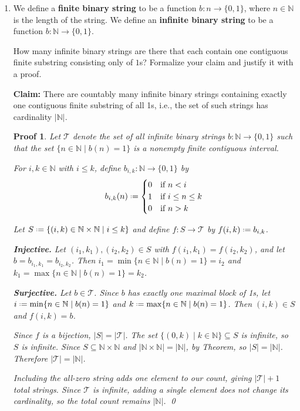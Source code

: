 \documentclass[12pt]{article}
\newcommand{\defn}[1]{\textbf{#1}}
\newcommand{\defeq}{\mathrel{\vcenter{\baselineskip0.5ex \lineskiplimit0pt
                     \hbox{\scriptsize.}\hbox{\scriptsize.}}}=}
\theoremstyle{proofstyle}
\newtheorem*{proof*}{Proof}
\begin{document}
\begin{enumerate}[left=0pt, itemsep=2em, parsep=1em]
\item We define a \defn{finite binary string} to be a function $b : n \to \{0, 1\}$, where $n \in \mathbb{N}$
is the length of the string. We define an \defn{infinite binary string} to be a function
$b : \mathbb{N} \to \{0, 1\}$.

How many infinite binary strings are there that each contain one contiguous finite
substring consisting only of $1$s? Formalize your claim and justify it with a proof.

\textbf{Claim:} There are countably many infinite binary strings containing exactly one
contiguous finite substring of all 1s, i.e., the set of such strings has cardinality $|\mathbb{N}|$.

\begin{proof*}
Let $\mathcal{T}$ denote the set of all infinite binary strings $b : \mathbb{N} \to \{0,1\}$
such that the set $\{n \in \mathbb{N} \mid b(n) = 1\}$ is a nonempty finite contiguous
interval.

For $i, k \in \mathbb{N}$ with $i \leq k$, define $b_{i,k} : \mathbb{N} \to \{0,1\}$ by
\[
  b_{i,k}(n) \defeq \begin{cases} 0 & \text{if } n < i \\ 1 & \text{if } i \leq n \leq k \\ 0 & \text{if } n > k \end{cases}
\]

Let $S \defeq \{(i,k) \in \mathbb{N} \times \mathbb{N} \mid i \leq k\}$ and define
$f : S \to \mathcal{T}$ by $f(i,k) \defeq b_{i,k}$.

\textbf{Injective.} Let $(i_1, k_1), (i_2, k_2) \in S$ with $f(i_1, k_1) = f(i_2, k_2)$,
and let $b = b_{i_1, k_1} = b_{i_2, k_2}$. Then
$i_1 = \min\{n \in \mathbb{N} \mid b(n) = 1\} = i_2$ and
$k_1 = \max\{n \in \mathbb{N} \mid b(n) = 1\} = k_2$.

\textbf{Surjective.} Let $b \in \mathcal{T}$. Since $b$ has exactly one maximal block of 1s,
let $i \defeq \min\{n \in \mathbb{N} \mid b(n) = 1\}$ and $k \defeq \max\{n \in \mathbb{N} \mid b(n) = 1\}$.
Then $(i, k) \in S$ and $f(i, k) = b$.

Since $f$ is a bijection, $|S| = |\mathcal{T}|$. The set $\{(0, k) \mid k \in \mathbb{N}\} \subseteq S$
is infinite, so $S$ is infinite. Since $S \subseteq \mathbb{N} \times \mathbb{N}$ and
$|\mathbb{N} \times \mathbb{N}| = |\mathbb{N}|$, by Theorem, so $|S| = |\mathbb{N}|$. Therefore $|\mathcal{T}| = |\mathbb{N}|$.

Including the all-zero string adds one element to our count, giving $|\mathcal{T}| + 1$
total strings. Since $\mathcal{T}$ is infinite, adding a single element does not change
its cardinality, so the total count remains $|\mathbb{N}|$. \qed
\end{proof*}
\end{enumerate}
\end{document}
